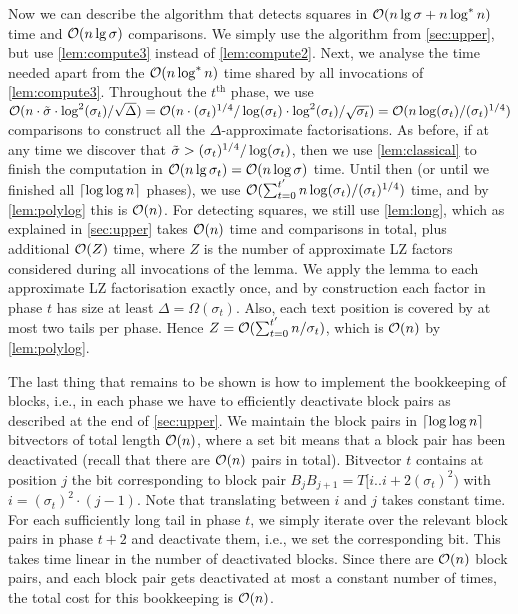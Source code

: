 Now we can describe the algorithm that detects squares in $\mathcal{O}(n \lg \sigma + n \log^* n)$ time and $\mathcal{O}(n \lg \sigma)$ comparisons. 
We simply use the algorithm from \cref{sec:upper}, but use \cref{lem:compute3} instead of \cref{lem:compute2}. Next, we analyse the time needed apart from the $\mathcal{O}(n \log^* n)$ time shared by all invocations of \cref{lem:compute3}. Throughout the $t^{\text{th}}$ phase, we use $\mathcal{O}(n \cdot \tilde{\sigma} \cdot \log^2(\sigma_t) / \sqrt{\Delta}) = \mathcal{O}(n\cdot (\sigma_{t})^{1/4}/\log(\sigma_{t})\cdot \log^2(\sigma_{t})/\sqrt{\sigma_{t}})=\mathcal{O}(n \log (\sigma_t)/(\sigma_{t})^{1/4})$ comparisons
to construct all the $\Delta$-approximate factorisations. As before, if at any time we discover that $\tilde{\sigma} > (\sigma_t)^{1/4} / \log(\sigma_t)$, then we use \cref{lem:classical} to finish the computation in $\mathcal{O}(n \lg \sigma_t) = \mathcal{O}(n \log \sigma)$ time. Until then (or until we finished all $\left\lceil\log \log n\right\rceil$ phases), we use $\mathcal{O}(\sum_{t=0}^{t'} n \log(\sigma_t)/(\sigma_{t})^{1/4})$ time, and by \cref{lem:polylog} this is $\mathcal{O}(n)$. 
For detecting squares, we still use \cref{lem:long}, which as explained in \cref{sec:upper} takes $\mathcal{O}(n)$ time and comparisons in total, plus additional $\mathcal{O}(Z)$ time, where $Z$ is the number of approximate LZ factors considered during all invocations of the lemma. 
We apply the lemma to each approximate LZ factorisation exactly once, and by construction each factor in phase $t$ has size at least $\Delta = \Omega(\sigma_t)$. Also, each text position is covered by at most two tails per phase. Hence $Z = \mathcal{O}(\sum_{t=0}^{t'} n/\sigma_t)$, which is $\mathcal{O}(n)$ by \cref{lem:polylog}.

The last thing that remains to be shown is how to implement the bookkeeping of blocks, i.e., in each phase we have to efficiently deactivate block pairs as described at the end of \cref{sec:upper}. 
We maintain the block pairs in $\left\lceil\log \log n\right\rceil$ bitvectors of total length $\mathcal{O}(n)$, where a set bit means that a block pair has been deactivated (recall that there are $\mathcal{O}(n)$ pairs in total). 
Bitvector $t$ contains at position $j$ the bit corresponding to block pair $B_{j}B_{j + 1} = T[i..i+2(\sigma_t)^2)$ with $i = (\sigma_t)^2 \cdot (j - 1)$. Note that translating between $i$ and $j$ takes constant time.
For each sufficiently long tail in phase $t$, we simply iterate over the relevant block pairs in phase $t + 2$ and deactivate them, i.e., we set the corresponding bit. This takes time linear in the number of deactivated blocks.
Since there are $\mathcal{O}(n)$ block pairs, and each block pair gets deactivated at most a constant number of times, the total cost for this bookkeeping is $\mathcal{O}(n)$.

